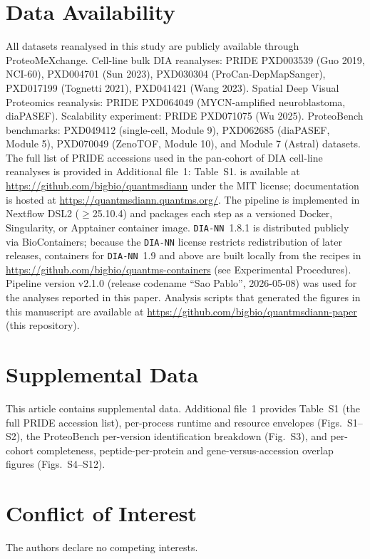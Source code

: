 \section*{Data Availability}
All datasets reanalysed in this study are publicly available through ProteoMeXchange.
Cell-line bulk DIA reanalyses: PRIDE PXD003539 (Guo 2019, NCI-60), PXD004701 (Sun 2023), PXD030304 (ProCan-DepMapSanger), PXD017199 (Tognetti 2021), PXD041421 (Wang 2023).
Spatial Deep Visual Proteomics reanalysis: PRIDE PXD064049 (MYCN-amplified neuroblastoma, diaPASEF).
Scalability experiment: PRIDE PXD071075 (Wu 2025).
ProteoBench benchmarks: PXD049412 (single-cell, Module 9), PXD062685 (diaPASEF, Module 5), PXD070049 (ZenoTOF, Module 10), and Module 7 (Astral) datasets.
The full list of PRIDE accessions used in the pan-cohort of DIA cell-line reanalyses is provided in Additional file~1: Table~S1.
\quantmsdiann{} is available at \url{https://github.com/bigbio/quantmsdiann} under the MIT license; documentation is hosted at \url{https://quantmsdiann.quantms.org/}.
The pipeline is implemented in Nextflow DSL2 ($\geq$25.10.4) and packages each step as a versioned Docker, Singularity, or Apptainer container image.
\texttt{DIA-NN}~1.8.1 is distributed publicly via BioContainers; because the \texttt{DIA-NN} license restricts redistribution of later releases, containers for \texttt{DIA-NN}~1.9 and above are built locally from the recipes in \url{https://github.com/bigbio/quantms-containers} (see Experimental Procedures).
Pipeline version v2.1.0 (release codename ``Sao Pablo'', 2026-05-08) was used for the analyses reported in this paper.
Analysis scripts that generated the figures in this manuscript are available at \url{https://github.com/bigbio/quantmsdiann-paper} (this repository).

\section*{Supplemental Data}
This article contains supplemental data.
Additional file~1 provides Table~S1 (the full PRIDE accession list), per-process runtime and resource envelopes (Figs.~S1--S2), the ProteoBench per-version identification breakdown (Fig.~S3), and per-cohort completeness, peptide-per-protein and gene-versus-accession overlap figures (Figs.~S4--S12).

\section*{Conflict of Interest}
The authors declare no competing interests.

